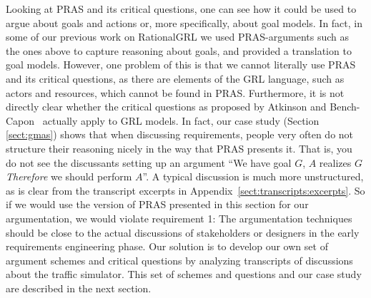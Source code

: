 Looking at PRAS and its critical questions, one can see how it could be used to argue about goals and actions or, more specifically, about goal models. In fact, in some of our previous work on RationalGRL \cite{vanzee-etal:renext2015,vanZee-etal:er2016} we used PRAS-arguments such as the ones above to capture reasoning about goals, and provided a translation to goal models. However, one problem of this is that we cannot literally use PRAS and its critical questions, as there are elements of the GRL language, such as actors and resources, which cannot be found in PRAS. Furthermore, it is not directly clear whether the critical questions as proposed by Atkinson and Bench-Capon~\cite{atkinson2007} actually apply to GRL models. In fact, our case study (Section \ref{sect:gmas}) shows that when discussing requirements, people very often do not structure their reasoning nicely in the way that PRAS presents it. That is, you do not see the discussants setting up an argument ``We have goal $G$, $A$ realizes $G$ \emph{Therefore} we should perform $A$''. A typical discussion is much more unstructured, as is clear from the transcript excerpts in Appendix~\ref{sect:transcripts:excerpts}. So if we would use the version of PRAS presented in this section for our argumentation, we would violate requirement 1: The argumentation techniques should be close to the actual discussions of stakeholders or designers in the early requirements engineering phase. Our solution is to develop our own set of argument schemes and critical questions by analyzing transcripts of discussions about the traffic simulator. This set of schemes and questions and our case study are described in the next section. 

